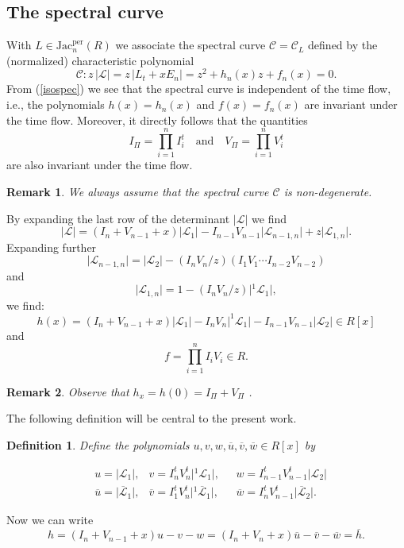\documentclass[11pt, a4paper]{amsart}
\newcommand{\eq}[1]{\begin{equation}#1 \end{equation}}
\newcommand{\eqst}[1]{\begin{equation*}#1\end{equation*}}
\theoremstyle{plain}
\newtheorem{remark}{Remark}[section]
\newtheorem{definition}{Definition}[section]
\numberwithin{equation}{section}
\begin{document}
\subsection{The spectral curve}
\label{sec-spectral}
With $L \in \mathrm{Jac}_n^{\mathrm{per}}(R)$ 
we associate the spectral curve $\mathcal C = \mathcal C_L$ 
defined by the (normalized) characteristic polynomial \eqst{\mathcal C : z \, \vert \mathcal L \vert =  z \, \vert L_t + x E_n \vert = z^2 + h_n(x) z + f_n(x) = 0.} From (\ref{isospec}) we see that the spectral curve is independent of the time flow, i.e., the polynomials $h(x) = h_n(x)$ and $f(x)=f_n(x)$ are invariant under the time flow. Moreover, it directly follows that the quantities \eqst{I_{\Pi} = \prod_{i=1}^n I_i^t \ \ \  \text{ and } \ \ \  V_{\Pi} = \prod_{i=1}^n V_i^t} are also invariant under the time flow. \begin{remark}We always assume that the spectral curve $\mathcal C$ is non-degenerate. 
\end{remark}
\noindent By expanding the last row of the determinant $\vert \mathcal L \vert$ we find \eqst{\vert \mathcal L \vert = (I_n+V_{n-1}+x)\vert \mathcal L_1 \vert-I_{n-1}V_{n-1}\vert\mathcal L _{n-1,n}\vert + z \vert \mathcal L_{1,n}\vert.} Expanding further \eqst{\vert\mathcal L_{n-1,n}\vert = \vert \mathcal L_2 \vert - (I_nV_n/z) (I_1V_1 \cdots I_{n-2}V_{n-2})} and \eqst{\vert\mathcal L _{1,n}\vert = 1-(I_nV_n/z) \vert {}^{1}\mathcal L_1 \vert,} we find: \eqst{h(x) = (I_n+V_{n-1} +x) \vert \mathcal L_1 \vert - I_n V_n \vert ^1 \mathcal L _1 \vert - I_{n-1} V_{n-1} \vert \mathcal L _ 2 \vert  \in R[x]} and \eqst{f = \prod_{i=1}^n I_i V_i \in R.}  
\begin{remark}
\label{remark-hx}
Observe that $h_x = h(0) = I_{\Pi}+V_{\Pi}$ .
\end{remark}
\noindent The following definition will be central to the present work.
\begin{definition}
\label{definitionuvw}
Define the polynomials $u,v,w,\overline u, \overline v, \overline w \in R[x]$ by 

\[
\begin{aligned}
&u  = \vert \mathcal L _1 \vert, 
&v  =  I^t_n V^t_n \vert {}^1\mathcal L _1 \vert, \ \ \ 
&w = I^t_{n-1}V^t_{n-1} \vert \mathcal L _ 2 \vert \\
&\overline u = \vert \overline{\mathcal L} _1 \vert, 
&\overline v =   I^t_1 V^t_n \vert {}^1\overline{\mathcal L} _1 \vert , \ \ \ 
&\overline w = I^t_{n}V^t_{n-1} \vert \overline{ \mathcal L} _ 2 \vert .
\end{aligned}
\]
\end{definition}
\noindent Now we can write \eq{\label{definitionh}\text{{$h = (I_n+V_{n-1}+x)u-v-w = (I_n+V_n+x)\overline u - \overline v - \overline w = \overline h $}}.}
\end{document}
